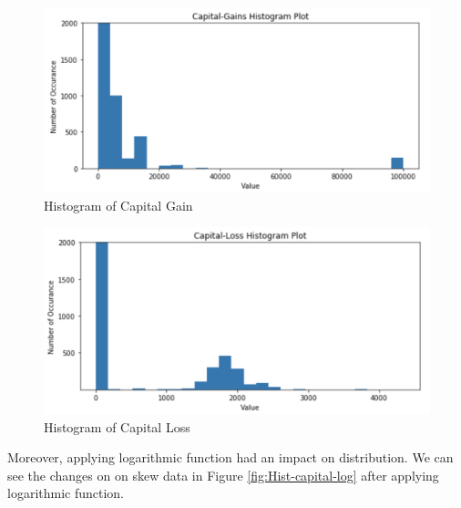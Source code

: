 \documentclass[sigconf]{acmart}
\begin{document}
 \begin{figure}[!ht]
  \centering
      \includegraphics[width=\columnwidth]{project/images/capital-gain.png}
  \caption{Histogram of Capital Gain \cite{}}\label{fig:Hist-capital}
\end{figure}

 \begin{figure}[!ht]
  \centering
      \includegraphics[width=\columnwidth]{project/images/capital-loss.png}
  \caption{Histogram of Capital Loss \cite{}}\label{fig:loss-capital}
\end{figure}

\par Moreover, applying logarithmic function had an impact on distribution. We can see the changes on on skew data in Figure \ref{fig:Hist-capital-log} after applying logarithmic function. 
\end{document}
